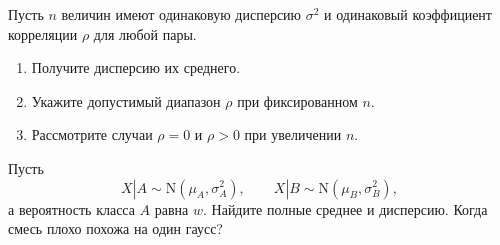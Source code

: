 \documentclass[
  russian,
  11pt,
  a4paper,
  open=any]{scrbook}
\providecommand{\tightlist}{%
  \setlength{\itemsep}{0pt}\setlength{\parskip}{0pt}}
\begin{document}
\begin{semanticpdfbox}[colback=BookCoralSoft,borderline west={1.2mm}{0pt}{BookCoral}]

\par\nopagebreak[4]\vspace{1.2mm}

Пусть \(n\) величин имеют одинаковую дисперсию \(\sigma^2\) и одинаковый
коэффициент корреляции \(\rho\) для любой пары.

\begin{enumerate}
\def\labelenumi{\arabic{enumi}.}
\tightlist
\item
  Получите дисперсию их среднего.
\item
  Укажите допустимый диапазон \(\rho\) при фиксированном \(n\).
\item
  Рассмотрите случаи \(\rho=0\) и \(\rho>0\) при увеличении \(n\).
\end{enumerate}

\end{semanticpdfbox}

\begin{semanticpdfbox}[colback=BookCoralSoft,borderline west={1.2mm}{0pt}{BookCoral}]

\par\nopagebreak[4]\vspace{1.2mm}

Пусть \[
X|A\sim\mathrm{N}(\mu_A,\sigma_A^2),\qquad
X|B\sim\mathrm{N}(\mu_B,\sigma_B^2),
\] а вероятность класса \(A\) равна \(w\). Найдите полные среднее и
дисперсию. Когда смесь плохо похожа на один гаусс?

\end{semanticpdfbox}
\end{document}
